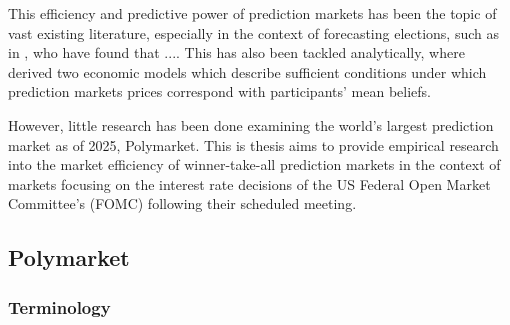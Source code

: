 


This efficiency and predictive power of prediction markets has been the topic
of vast existing literature, especially in the context of forecasting elections, such as in
\cite{berg_prediction_2008} \cite{erikson_are_2008}, who have found that .... 
This has also been tackled analytically, where \cite{wolfers_interpreting_2006} derived two economic models which
describe sufficient conditions under which prediction markets prices correspond with participants' mean beliefs.

However, little research has been done examining the world's largest prediction market as of 2025, Polymarket.
This is thesis aims to provide empirical research into the market efficiency of winner-take-all prediction markets 
in the context of markets focusing on the interest rate decisions of the US Federal Open Market Committee's (FOMC) following their scheduled meeting.

\newpage

\subsection{Polymarket}


\subsubsection{Terminology}


